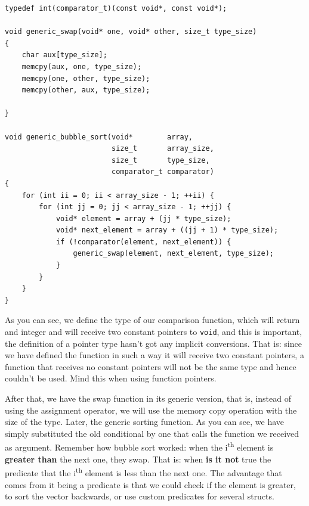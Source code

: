 \documentclass[a4paper]{article}
\begin{document}
\noindent
\begin{minipage}[H]{\linewidth}
\mbox{}
\begin{lstlisting}[style=C,
caption={Generic \texttt{bubble\_sort} definition},
label={lst:bubbleSortGeneric}]
typedef int(comparator_t)(const void*, const void*);

void generic_swap(void* one, void* other, size_t type_size)
{
    char aux[type_size];
    memcpy(aux, one, type_size);
    memcpy(one, other, type_size);
    memcpy(other, aux, type_size);

}

void generic_bubble_sort(void*        array,
                         size_t       array_size,
                         size_t       type_size,
                         comparator_t comparator)
{
    for (int ii = 0; ii < array_size - 1; ++ii) {
        for (int jj = 0; jj < array_size - 1; ++jj) {
            void* element = array + (jj * type_size);
            void* next_element = array + ((jj + 1) * type_size);
            if (!comparator(element, next_element)) {
                generic_swap(element, next_element, type_size);
            }
        }
    }
}
\end{lstlisting}
\end{minipage}

As you can see, we define the type of our comparison function, which will return
and integer and will receive two constant pointers to \verb!void!, and this is
important, the definition of a pointer type hasn't got any implicit conversions.
That is: since we have defined the function in such a way it will receive two
constant pointers, a function that receives no constant pointers will not be
the same type and hence couldn't be used. Mind this when using function
pointers.

After that, we have the swap function in its generic version, that is, instead
of using the assignment operator, we will use the memory copy operation with the
size of the type. Later, the generic sorting function. As you can see, we have
simply substituted the old conditional by one that calls the function we
received as argument. Remember how bubble sort worked: when the
i\textsuperscript{th} element is \textbf{greater than} the next one, they swap.
That is: when \textbf{is it not} true the predicate that the
i\textsuperscript{th} element is less than the next one. The advantage that
comes from it being a predicate is that we could check if the element is
greater, to sort the vector backwards, or use custom predicates for several
structs.
\end{document}
